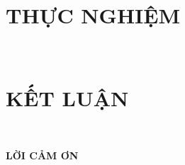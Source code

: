 \documentclass[conference]{IEEEtran}
\begin{document}
\section{\textbf{THỰC NGHIỆM}}





















\hfill\\

\section{\textbf{KẾT LUẬN}}

\hfill\\

\begin{center}
\textbf{LỜI CẢM ƠN}
\end{center}

\hfill\\

\printbibliography[title={\textbf{TÀI LIỆU}}]
\end{document}
